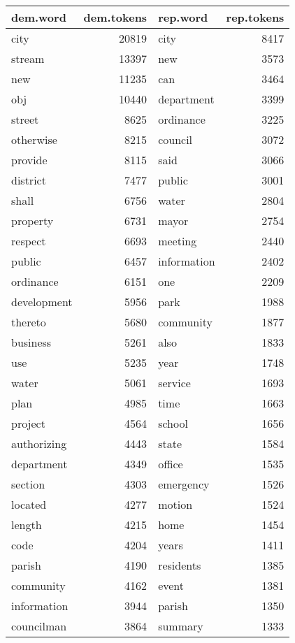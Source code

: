\begin{table}[ht]
\centering
\begin{tabular}{lrlr}
  \hline
dem.word & dem.tokens & rep.word & rep.tokens \\ 
  \hline
city & 20819 & city & 8417 \\ 
  stream & 13397 & new & 3573 \\ 
  new & 11235 & can & 3464 \\ 
  obj & 10440 & department & 3399 \\ 
  street & 8625 & ordinance & 3225 \\ 
  otherwise & 8215 & council & 3072 \\ 
  provide & 8115 & said & 3066 \\ 
  district & 7477 & public & 3001 \\ 
  shall & 6756 & water & 2804 \\ 
  property & 6731 & mayor & 2754 \\ 
  respect & 6693 & meeting & 2440 \\ 
  public & 6457 & information & 2402 \\ 
  ordinance & 6151 & one & 2209 \\ 
  development & 5956 & park & 1988 \\ 
  thereto & 5680 & community & 1877 \\ 
  business & 5261 & also & 1833 \\ 
  use & 5235 & year & 1748 \\ 
  water & 5061 & service & 1693 \\ 
  plan & 4985 & time & 1663 \\ 
  project & 4564 & school & 1656 \\ 
  authorizing & 4443 & state & 1584 \\ 
  department & 4349 & office & 1535 \\ 
  section & 4303 & emergency & 1526 \\ 
  located & 4277 & motion & 1524 \\ 
  length & 4215 & home & 1454 \\ 
  code & 4204 & years & 1411 \\ 
  parish & 4190 & residents & 1385 \\ 
  community & 4162 & event & 1381 \\ 
  information & 3944 & parish & 1350 \\ 
  councilman & 3864 & summary & 1333 \\ 
   \hline
\end{tabular}
\end{table}

